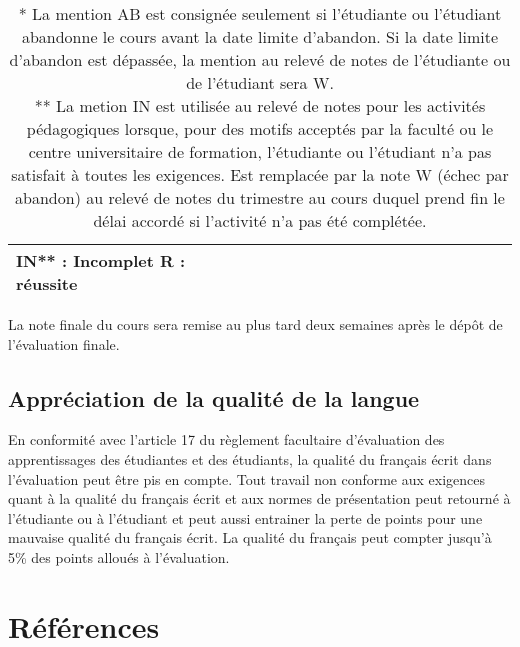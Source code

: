 \documentclass[12]{article}
\begin{document}
\begin{center}
\begin{table}[h]
\begin{tabular}{| p{0.2\linewidth} | p{0.2\linewidth} | p{0.2\linewidth} | p{0.2\linewidth} | p{0.2\linewidth} | }
        \multicolumn{2}{l}{
            IN** : Incomplet\hfill\hfill \linebreak 
            R : réussite\hfill\hfill} \\
		\hline
		\end{tabular}
		\caption*{* La mention AB est consignée seulement si l’étudiante ou l’étudiant abandonne le cours avant la date
		limite d'abandon. Si la date limite d’abandon est dépassée, la mention au relevé de notes de l’étudiante
		ou de l’étudiant sera W.\\
		** La metion IN est utilisée au relevé de notes pour les activités
		pédagogiques lorsque, pour des motifs acceptés par la faculté ou le
		centre universitaire de formation, l’étudiante ou l’étudiant n’a pas
		satisfait à toutes les exigences. Est remplacée par la note W (échec
		par abandon) au relevé de notes du trimestre au cours duquel prend fin
		le délai accordé si l’activité n’a pas été complétée.}
		\end{table}
	\end{center}

    La note finale du cours sera remise au plus tard deux semaines après le
	dépôt de l'évaluation finale.

    \subsection*{Appréciation de la qualité de la langue}

    En conformité avec l'article 17 du règlement facultaire d'évaluation
    des apprentissages des étudiantes et des étudiants, la qualité du français
    écrit dans l’évaluation peut être pis en compte. Tout travail non conforme
    aux exigences quant à la qualité du français écrit et aux normes de
    présentation  peut retourné à l'étudiante ou à l'étudiant et peut aussi
    entrainer la perte de points pour une mauvaise qualité du français écrit.
    La qualité du français peut compter jusqu'à 5\% des points alloués à
    l'évaluation.

	
	
    
    

	\section*{Références}
\end{document}
